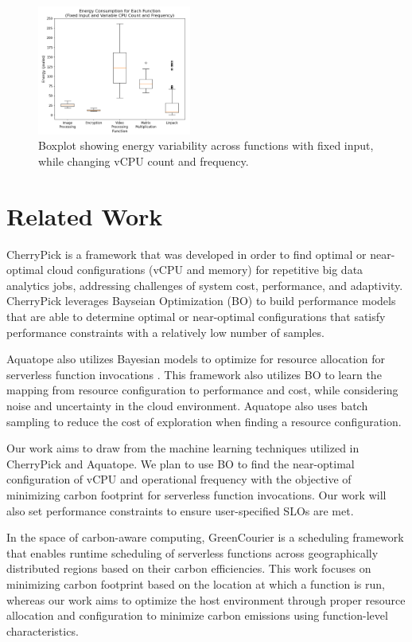 \documentclass[times, 10pt,twocolumn]{article}
\begin{document}
\begin{figure}[ht]
   \centering
   \includegraphics[width=0.45\textwidth]{imgs/energy_boxplot.png}
   \caption{Boxplot showing energy variability across functions with fixed input, while changing vCPU count and frequency. }
   \label{fig:energy_boxplot}
 \end{figure}
\section{Related Work}
CherryPick\cite{CherryPick} is a framework that was developed in order to find optimal or near-optimal cloud configurations (vCPU and memory) for repetitive big data analytics jobs, addressing challenges of system cost, performance, and adaptivity. CherryPick leverages Bayseian Optimization (BO) to build performance models that are able to determine optimal or near-optimal configurations that satisfy performance constraints with a relatively low number of samples. 

Aquatope also utilizes Bayesian models to optimize for resource allocation for serverless function invocations \cite{AQUATOPE}. This framework also utilizes BO to learn the mapping from resource configuration to performance and cost, while considering noise and uncertainty in the cloud environment. Aquatope also uses batch sampling to reduce the cost of exploration when finding a resource configuration.

Our work aims to draw from the machine learning techniques utilized in CherryPick and Aquatope. We plan to use BO to find the near-optimal configuration of vCPU and operational frequency with the objective of minimizing carbon footprint for serverless function invocations. Our work will also set performance constraints to ensure user-specified SLOs are met.

In the space of carbon-aware computing, GreenCourier \cite{GreenCourier} is a scheduling framework that enables runtime scheduling of serverless functions across geographically distributed regions based on their carbon efficiencies. This work focuses on minimizing carbon footprint based on the location at which a function is run, whereas our work aims to optimize the host environment through proper resource allocation and configuration to minimize carbon emissions using function-level characteristics.
\end{document}

